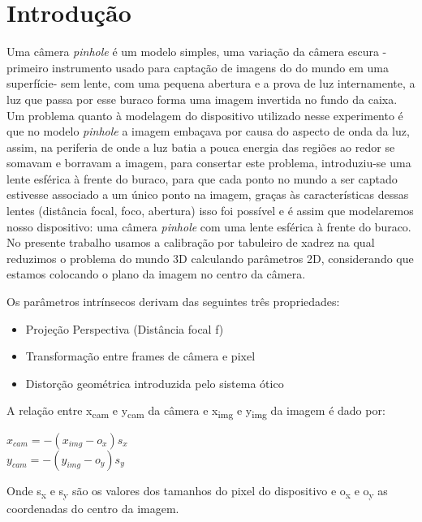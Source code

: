 \documentclass[conference,harvard,brazil,english]{sbatex}
\begin{document}
	\section{Introdução}
		\par Uma câmera \textit{pinhole} é um modelo simples, uma variação da câmera escura - primeiro instrumento usado para captação de imagens do do mundo em uma superfície- sem lente, com uma pequena abertura e a prova de luz internamente, a luz que passa por esse buraco forma uma imagem invertida no fundo da caixa. Um problema quanto à modelagem do dispositivo utilizado nesse experimento é que no modelo \textit{pinhole} a imagem embaçava por causa do aspecto de onda da luz, assim, na periferia de onde a luz batia a pouca energia das regiões ao redor se somavam e borravam a imagem, para consertar este problema, introduziu-se uma lente esférica à frente do buraco, para que cada ponto no mundo a ser captado estivesse associado a um único ponto na imagem, graças às características dessas lentes (distância focal, foco, abertura) isso foi possível e é assim que modelaremos nosso dispositivo: uma câmera \textit{pinhole} com uma lente esférica à frente do buraco. No presente trabalho usamos a calibração por tabuleiro de xadrez na qual reduzimos o problema do mundo 3D calculando parâmetros 2D, considerando que estamos colocando o plano da imagem no centro da câmera. 
		\par Os parâmetros intrínsecos derivam das seguintes três propriedades:
		\begin{itemize}
			\item[\Checkmark] Projeção Perspectiva (Distância focal f)
			\item[\Checkmark] Transformação entre frames de câmera e pixel
			\item[\Checkmark] Distorção geométrica introduzida pelo sistema ótico
		\end{itemize}
		\par A relação entre x\textsubscript{cam} e y\textsubscript{cam} da câmera e x\textsubscript{img} e y\textsubscript{img} da imagem é dado por:
		\begin{center}
			$ x_{cam} = -(x_{img}-o_{x})s_{x} $\\
			$ y_{cam} = -(y_{img}-o_{y})s_{y} $\\
		\end{center}
		 \par Onde s\textsubscript{x} e s\textsubscript{y} são os valores dos tamanhos do pixel do dispositivo e o\textsubscript{x} e o\textsubscript{y} as coordenadas do centro da imagem.
\end{document}
